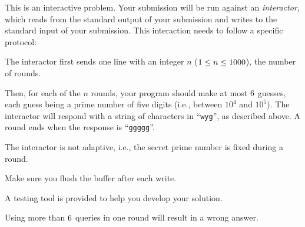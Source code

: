 \begin{Interaction}
    This is an interactive problem.
    Your submission will be run against an \emph{interactor},
    which reads from the standard output of your submission
    and writes to the standard input of your submission.
    This interaction needs to follow a specific protocol:

    The interactor first sends
    one line with an integer $n$ ($1 \leq n \leq 1000$),
    the number of rounds.

    Then, for each of the $n$ rounds,
    your program should make at most $6$ guesses,
    each guess being a prime number of five digits (i.e., between $10^4$ and $10^5$).
    The interactor will respond with a string of characters in ``\texttt{wyg}'', as described above.
    A round ends when the response is ``\texttt{ggggg}''.

    The interactor is not adaptive, i.e., the secret prime number is fixed during a round.

    Make sure you flush the buffer after each write.

    A testing tool is provided to help you develop your solution.

    Using more than $6$ queries in one round will result in a wrong answer.
\end{Interaction}

\pagebreak %
